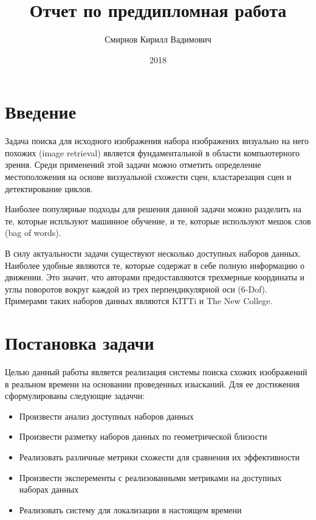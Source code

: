 \documentclass[12pt, specialist, subf, substylefile = spbu.rtx]{disser}
\begin{document}
\title{Отчет по преддипломная работа}
\author{Смирнов Кирилл Вадимович}

\date{2018}
\maketitle

\tableofcontents
\section{Введение}
Задача поиска для исходного изображения набора изображених визуально на него похожих (image retrieval) является фундаментальной в области компьютерного зрения. Среди применений этой задачи можно отметить определение местоположения на основе виззуальной схожести сцен, кластарезация сцен и детектирование циклов.
\par Наиболее популярные подходы для решения данной задачи можно разделить на те, которые испльзуют машинное обучение, и те, которые используют мешок слов (bag of words). 
\par В силу актуальности задачи существуют несколько доступных наборов данных. Наиболее удобные являются те, которые содержат в себе полную информацию о движении. Это значит, что авторами предоставляются трехмерные координаты и углы поворотов вокруг каждой из трех перпендикулярной оси (6-Dof). Примерами таких наборов данных являются KITTi и The New College.

\newpage
\section{Постановка задачи}
Целью данный работы является реализация системы поиска схожих изображений в реальном времени на основании проведенных изысканий. Для ее достижения сформулированы следующие задаччи:
\begin{itemize}
    \item Произвести анализ доступных наборов данных
    \item Произвести разметку наборов данных по геометрической близости
    \item Реализовать различные метрики схожести для сравнения их эффективности
    \item Произвести эксперементы с реализованными метриками на доступных наборах данных
    \item Реализовать систему для локализации в настоящем времени
\end{itemize}
\end{document}
